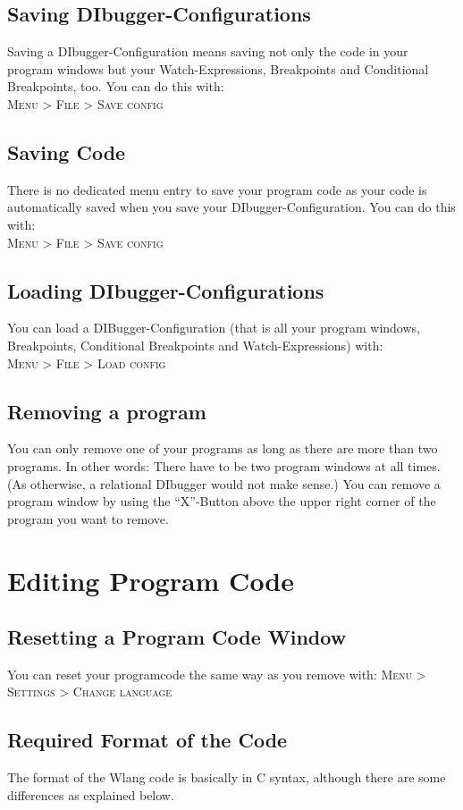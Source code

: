 \documentclass[parskip=full]{memoir}
\begin{document}
 \section{Saving DIbugger-Configurations}
Saving a DIbugger-Configuration means saving not only the code in your program windows but your Watch-Expressions, Breakpoints and Conditional Breakpoints, too.
You can do this with: \\
\textsc{Menu > File > Save config}
\section{Saving Code}
There is no dedicated menu entry to save your program code as your code is automatically saved when you save your DIbugger-Configuration. You can do this with: \\
\textsc{Menu > File > Save config}
\section{Loading DIbugger-Configurations}
You can load a DIBugger-Configuration (that is all your program windows, Breakpoints, Conditional Breakpoints and Watch-Expressions) with:\\
\textsc{Menu > File > Load config}
\section{Removing a program}\label{removeProgram}
You can only remove one of your programs as long as there are more than two programs. In other words: There have to be two program windows at all times. (As otherwise, a relational DIbugger would not make sense.)
You can remove a program window by using the \enquote{X}-Button above the upper right corner of the program you want to remove.
\chapter{Editing Program Code} %
\section{Resetting a Program Code Window}
You can reset your programcode the same way as you remove with:
 \textsc{Menu > Settings > Change language}
\section{Required Format of the Code}
The format of the Wlang code is basically in C syntax, although there are some differences as explained below.
\end{document}
